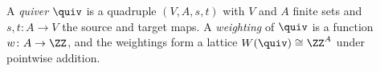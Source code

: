 \begin{definition}[Quiver]\label{sh-0002}
A \emph{quiver} $\quiv$ is a quadruple $(V, A, s, t)$ with $V$ and $A$ finite sets and $s, t \colon A \to V$ the source and target maps. A \emph{weighting} of $\quiv$ is a function $w \colon A \to \ZZ$, and the weightings form a lattice $W(\quiv) \cong \ZZ^{A}$ under pointwise addition.
\end{definition}
